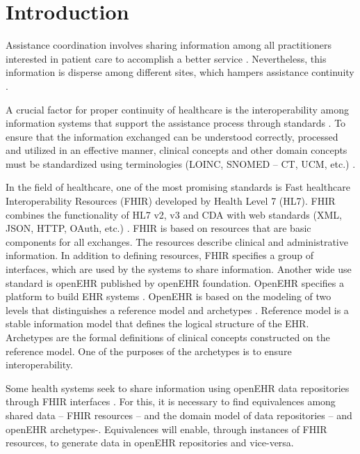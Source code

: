 \section{Introduction}

Assistance coordination involves sharing information among all practitioners interested in patient care to accomplish a better service \cite{CareCoordination}. Nevertheless, this information is disperse among different sites, which hampers assistance continuity \cite{Indarte11}.

A crucial factor for proper continuity of healthcare is the interoperability among information systems that support the assistance process through standards \cite{OPS16}. To ensure that the information exchanged can be understood correctly, processed and utilized in an effective manner, clinical concepts and other domain concepts must be standardized using terminologies (LOINC, SNOMED – CT, UCM, etc.) \cite{ISO20514}.

In the field of healthcare, one of the most promising standards is Fast healthcare Interoperability Resources (FHIR) developed by Health Level 7 (HL7). FHIR combines the functionality of HL7 v2, v3 and CDA with web  standards (XML, JSON, HTTP, OAuth, etc.) \cite{FHIR}. FHIR is based on resources that are basic components for all exchanges. The resources describe clinical and administrative information. In addition to defining resources, FHIR specifies a group of interfaces, which are used by the systems to share information. Another wide use standard is openEHR published by openEHR foundation. OpenEHR specifies a platform to build EHR systems \cite{openEHR}. OpenEHR is based on the modeling of two levels that distinguishes a reference model and archetypes \cite{Bale00}. Reference model is a stable information model that defines the logical structure of the EHR. Archetypes are the formal definitions of clinical concepts constructed on the reference model. One of the purposes of the archetypes is to ensure interoperability.

Some health systems seek to share information using openEHR data repositories through FHIR interfaces \cite{Lopez16}. For this, it is necessary to find equivalences among shared data – FHIR resources – and the domain model of data repositories – and openEHR archetypes-. Equivalences will enable, through instances of FHIR resources, to generate data in openEHR repositories and vice-versa.


